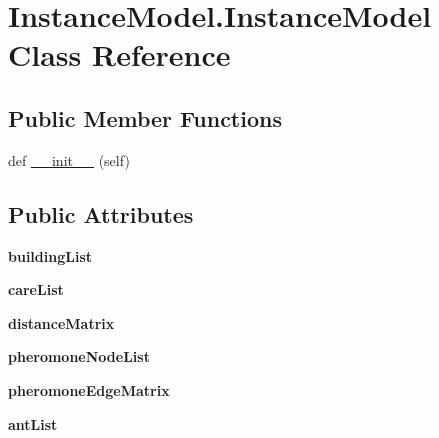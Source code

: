 \hypertarget{class_instance_model_1_1_instance_model}{}\section{Instance\+Model.\+Instance\+Model Class Reference}
\label{class_instance_model_1_1_instance_model}
\subsection*{Public Member Functions}
\begin{DoxyCompactItemize}
\item 
def \mbox{\hyperlink{class_instance_model_1_1_instance_model_a1dc30e37013930d2e46caa7041298157}{\+\_\+\+\_\+init\+\_\+\+\_\+}} (self)
\end{DoxyCompactItemize}
\subsection*{Public Attributes}
\begin{DoxyCompactItemize}
\item 
\mbox{\label{class_instance_model_1_1_instance_model_a5396b60a560d6fb125b7a884ac9e0dd5}} 
{\bfseries building\+List}
\item 
\mbox{\label{class_instance_model_1_1_instance_model_a0ebf216fd055c6bf4aa3370a447f807b}} 
{\bfseries care\+List}
\item 
\mbox{\label{class_instance_model_1_1_instance_model_a5623321d9d653e37342c0bba9bde37d4}} 
{\bfseries distance\+Matrix}
\item 
\mbox{\label{class_instance_model_1_1_instance_model_a33c898c982f3a6a2ad1bcefb65768b8b}} 
{\bfseries pheromone\+Node\+List}
\item 
\mbox{\label{class_instance_model_1_1_instance_model_a158d8dff7d7fdc3f99be3366a599389e}} 
{\bfseries pheromone\+Edge\+Matrix}
\item 
\mbox{\label{class_instance_model_1_1_instance_model_abee0cc01b02603e5f42b60bafa6281f7}} 
{\bfseries ant\+List}
\end{DoxyCompactItemize}


